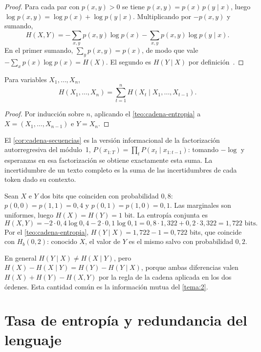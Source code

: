 \begin{proof}
Para cada par con $p(x,y)>0$ se tiene $p(x,y)=p(x)\,p(y\mid x)$, luego $\log p(x,y)=\log p(x)+\log p(y\mid x)$. Multiplicando por $-p(x,y)$ y sumando,
\[
H(X,Y)=-\sum_{x,y}p(x,y)\log p(x)-\sum_{x,y}p(x,y)\log p(y\mid x).
\]
En el primer sumando, $\sum_y p(x,y)=p(x)$, de modo que vale $-\sum_x p(x)\log p(x)=H(X)$. El segundo es $H(Y\mid X)$ por definición~\cite[§2.2]{ct}.
\end{proof}

\begin{corolario}\label{cor:cadena-secuencias}
Para variables $X_1,\dots,X_n$,
\[
H(X_1,\dots,X_n)=\sum_{t=1}^{n}H(X_t\mid X_1,\dots,X_{t-1}).
\]
\end{corolario}

\begin{proof}
Por inducción sobre $n$, aplicando el \cref{teo:cadena-entropia} a $X=(X_1,\dots,X_{n-1})$ e $Y=X_n$.
\end{proof}

El \cref{cor:cadena-secuencias} es la versión informacional de la factorización autorregresiva del módulo~1, $P(x_{1:T})=\prod_t P(x_t\mid x_{1:t-1})$: tomando $-\log$ y esperanzas en esa factorización se obtiene exactamente esta suma. La incertidumbre de un texto completo es la suma de las incertidumbres de cada token dado su contexto.

\begin{ejemplo}\label{ej:dos-bits}
Sean $X$ e $Y$ dos bits que coinciden con probabilidad $0{,}8$: $p(0,0)=p(1,1)=0{,}4$ y $p(0,1)=p(1,0)=0{,}1$. Las marginales son uniformes, luego $H(X)=H(Y)=1$ bit. La entropía conjunta es
\[
H(X,Y)=-2\cdot 0{,}4\log 0{,}4-2\cdot 0{,}1\log 0{,}1=0{,}8\cdot 1{,}322+0{,}2\cdot 3{,}322=1{,}722\text{ bits}.
\]
Por el \cref{teo:cadena-entropia}, $H(Y\mid X)=1{,}722-1=0{,}722$ bits, que coincide con $H_b(0{,}2)$: conocido $X$, el valor de $Y$ es el mismo salvo con probabilidad $0{,}2$.
\end{ejemplo}

\begin{observacion}
En general $H(Y\mid X)\ne H(X\mid Y)$, pero $H(X)-H(X\mid Y)=H(Y)-H(Y\mid X)$, porque ambas diferencias valen $H(X)+H(Y)-H(X,Y)$ por la regla de la cadena aplicada en los dos órdenes. Esta cantidad común es la información mutua del \cref{tema:2}.
\end{observacion}

\section{Tasa de entropía y redundancia del lenguaje}

